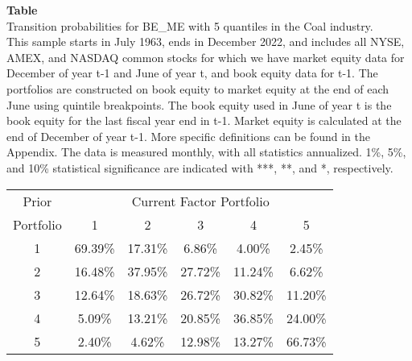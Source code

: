 \begin{table*}[ht!]
\raggedright
{}
\label{tab: transition_probs_BE_ME_Coal_with_5_quantiles}
\textbf{Table \thetable} \\
Transition probabilities for BE_ME with 5 quantiles in the Coal industry. \\
\hspace*{1em}This sample starts in July 1963, ends in December 2022, and includes all NYSE, AMEX, and NASDAQ common stocks for which we have market equity data for December of year t-1 and June of year t, and book equity data for t-1. The portfolios are constructed on book equity to market equity at the end of each June using quintile breakpoints.  The book equity used in June of year t is the book equity for the last fiscal year end in t-1.  Market equity is calculated at the end of December of year t-1.  More specific definitions can be found in the Appendix.  The data is measured monthly, with all statistics annualized.  1\%, 5\%, and 10\% statistical significance are indicated with ***, **, and *, respectively. \\
\vspace{0.5em}
\centering
\begin{adjustbox}{max width=\textwidth}
\begin{tabular}{@{}cccccc@{}}
\toprule
Prior & \multicolumn{5}{c}{Current Factor Portfolio} \\
Portfolio & 1 & 2 & 3 & 4 & 5 \\
\midrule
1 & 69.39\% & 17.31\% & 6.86\% & 4.00\% & 2.45\% \\
2 & 16.48\% & 37.95\% & 27.72\% & 11.24\% & 6.62\% \\
3 & 12.64\% & 18.63\% & 26.72\% & 30.82\% & 11.20\% \\
4 & 5.09\% & 13.21\% & 20.85\% & 36.85\% & 24.00\% \\
5 & 2.40\% & 4.62\% & 12.98\% & 13.27\% & 66.73\% \\
\bottomrule
\end{tabular}
\end{adjustbox}
\end{table*}